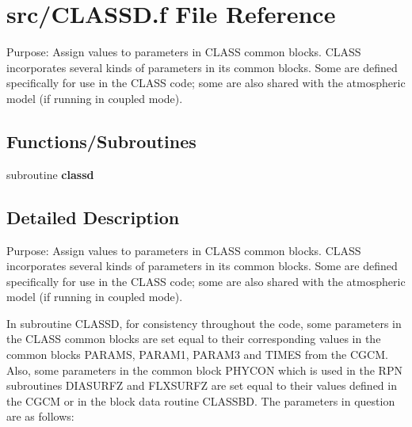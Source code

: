 \hypertarget{CLASSD_8f}{}\section{src/\+C\+L\+A\+S\+S\+D.f File Reference}
\label{CLASSD_8f}


Purpose\+: Assign values to parameters in C\+L\+A\+S\+S common blocks. C\+L\+A\+S\+S incorporates several kinds of parameters in its common blocks. Some are defined specifically for use in the C\+L\+A\+S\+S code; some are also shared with the atmospheric model (if running in coupled mode).  


\subsection*{Functions/\+Subroutines}
\begin{DoxyCompactItemize}
\item 
\hypertarget{CLASSD_8f_a0488b892c063c27c2ad69ed210df2bc5}{}subroutine {\bfseries classd}\label{CLASSD_8f_a0488b892c063c27c2ad69ed210df2bc5}

\end{DoxyCompactItemize}


\subsection{Detailed Description}
Purpose\+: Assign values to parameters in C\+L\+A\+S\+S common blocks. C\+L\+A\+S\+S incorporates several kinds of parameters in its common blocks. Some are defined specifically for use in the C\+L\+A\+S\+S code; some are also shared with the atmospheric model (if running in coupled mode). 

In subroutine C\+L\+A\+S\+S\+D, for consistency throughout the code, some parameters in the C\+L\+A\+S\+S common blocks are set equal to their corresponding values in the common blocks P\+A\+R\+A\+M\+S, P\+A\+R\+A\+M1, P\+A\+R\+A\+M3 and T\+I\+M\+E\+S from the C\+G\+C\+M. Also, some parameters in the common block P\+H\+Y\+C\+O\+N which is used in the R\+P\+N subroutines D\+I\+A\+S\+U\+R\+F\+Z and F\+L\+X\+S\+U\+R\+F\+Z are set equal to their values defined in the C\+G\+C\+M or in the block data routine C\+L\+A\+S\+S\+B\+D. The parameters in question are as follows\+:


